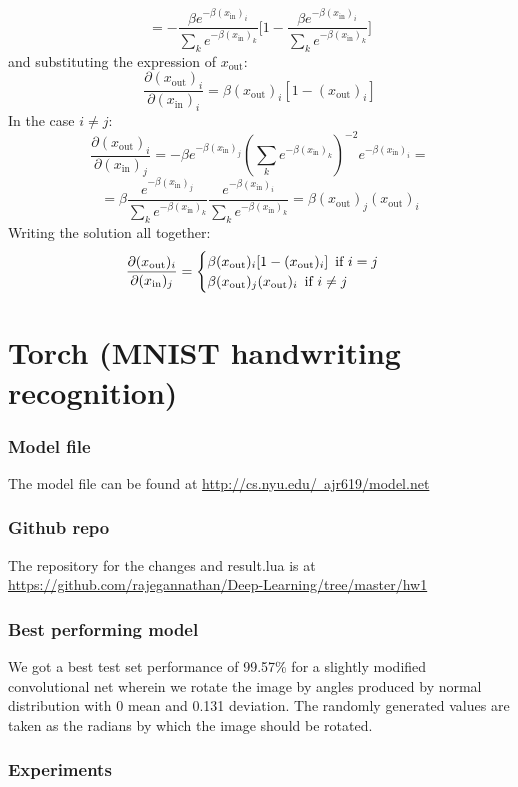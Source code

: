 \documentclass{article}
\begin{document}
\begin{enumerate}
$$
=-\frac{\beta e^{-\beta (x_{\text{in}})_i}}{\sum_k e^{-\beta (x_{\text{in}})_k} } \Big[  1-\frac{\beta e^{-\beta (x_{\text{in}})_i}}{\sum_k e^{-\beta (x_{\text{in}})_k} }\Big]
$$and substituting the expression of $x_{\text{out}}$:
$$
\frac{\partial (x_{\text{out}})_i}{\partial (x_{\text{in}})_i} =\beta  (x_{\text{out}})_i [1- (x_{\text{out}})_i]
$$
In the case $i\neq j$:
$$
\frac{\partial (x_{\text{out}})_i}{\partial (x_{\text{in}})_j} =    
-\beta e^{-\beta (x_{\text{in}})_j} (\sum_k e^{-\beta (x_{\text{in}})_k} )^{-2} e^{-\beta (x_{\text{in}})_i} =
$$ 
$$
=\beta \frac{e^{-\beta (x_{\text{in}})_j}}{\sum_k e^{-\beta (x_{\text{in}})_k} }
\frac{e^{-\beta (x_{\text{in}})_i}}{\sum_k e^{-\beta (x_{\text{in}})_k} } =\beta (x_{\text{out}})_j(x_{\text{out}})_i 
$$
Writing the solution all together:
\begin{equation*}
      \frac{\partial (x_{\text{out}})_i}{\partial (x_{\text{in}})_j} = \begin{cases}
                       \beta  (x_{\text{out}})_i [1- (x_{\text{out}})_i]   \text{\,	if  $i= j$}\\
                        \beta (x_{\text{out}})_j(x_{\text{out}})_i   \text{\,	if  $i\neq j$}
                    \end{cases}
\end{equation*}

\end{enumerate}

\section[Kaggle contest]{Torch (MNIST handwriting recognition)}

\subsubsection{Model file}
  The model file can be found at \href{http://cs.nyu.edu/~ajr619/model.net}{http://cs.nyu.edu/~ajr619/model.net}
\subsubsection{Github repo}
  The repository for the changes and result.lua is at \\
  \href{https://github.com/rajegannathan/Deep-Learning/tree/master/hw1}{https://github.com/rajegannathan/Deep-Learning/tree/master/hw1}
\subsubsection{Best performing model}
  We got a best test set performance of 99.57\% for a slightly modified convolutional net wherein we rotate the image by angles produced by normal distribution with 0 mean and 0.131 deviation.  The randomly generated values are taken as the radians by which the image should be rotated.
\subsubsection{Experiments}
\end{document}
